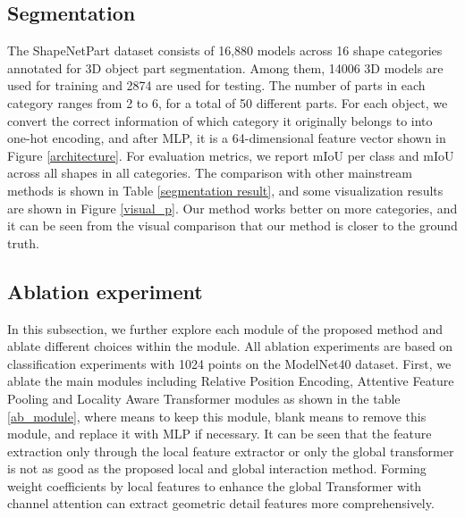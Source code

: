 \documentclass[conference]{IEEEtran}
\begin{document}
\subsection{Segmentation} The ShapeNetPart \cite{yi2016scalable} dataset consists of 16,880 models across 16 shape categories annotated for 3D object part segmentation. Among them, 14006 3D models are used for training and 2874 are used for testing. The number of parts in each category ranges from 2 to 6, for a total of 50 different parts. For each object, we convert the correct information of which category it originally belongs to into one-hot encoding, and after MLP, it is a 64-dimensional feature vector shown in Figure \ref{architecture}. For evaluation metrics, we report mIoU per class and mIoU across all shapes in all categories. The comparison with other mainstream methods is shown in  Table \ref{segmentation result}, and some visualization results are shown in Figure \ref{visual_p}. Our method works better on more categories, and it can be seen from the visual comparison that our method is closer to the ground truth.



\vspace{-0.2cm}

\subsection{Ablation experiment} In this subsection, we further explore each module of the proposed method and ablate different choices within the module. All ablation experiments are based on classification experiments with 1024 points on the ModelNet40 \cite{wu20153d} dataset. First, we ablate the main modules including Relative Position Encoding, Attentive Feature Pooling and Locality Aware Transformer modules as shown in the table \ref{ab_module}, where \Checkmark means to keep this module, blank means to remove this module, and replace it with MLP if necessary. It can be seen that the feature extraction only through the local feature extractor or only the global transformer is not as good as the proposed local and global interaction method. Forming weight coefficients by local features to enhance the global Transformer with channel attention can extract geometric detail features more comprehensively.
\end{document}
